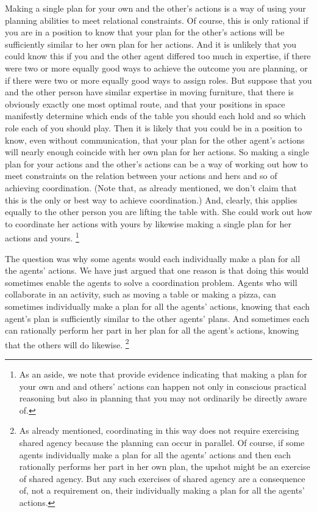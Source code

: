 \documentclass[12pt,\papersize]{extarticle}
\begin{document}
Making a single plan for your own and the other's actions is a way of using your planning abilities to meet relational constraints.
Of course, 
this is only rational  if you are in a position to know that your plan for the other's actions will be sufficiently similar to her own plan for her actions.
And it is unlikely that you could know this if 
	you and the other agent differed too much in expertise,
	if there were two or more equally good ways to achieve the outcome you are planning,
	or if there were two or more equally good ways to assign roles.
But suppose that you and the other person have similar expertise in moving furniture, 
	that there is obviously exactly one most optimal route,
	 and that your positions in space manifestly determine which ends of the table you should each hold and so which role each of you should play. 
Then it is likely that you could  be in a position to know,
	even without communication,
	that your plan for the other agent's actions will nearly enough coincide with her own plan for her actions.
So  making a single plan for your actions and the other's actions can be a way of 
	working out how to 
	meet constraints on the relation between your actions and hers and so of achieving coordination.  
(Note that, as already mentioned,  we don't claim that this  is the only or best way to achieve coordination.)	
And, clearly, this applies equally to the 
 other person you are lifting the table with.
 She  could work out how to coordinate her actions with yours by likewise making a single plan for her actions and yours.%
\footnote{
As an aside, we note that 
\citet{tsai:2011_groop_effect} provide evidence indicating that making a plan for your own and and others' actions can happen not only in conscious practical reasoning but also in planning that you may not ordinarily be directly aware of.
}

The question was why some agents would each individually make a plan for all the agents' actions.
We have just argued that  
one reason is that
doing this would sometimes enable the agents to solve a coordination problem.
Agents who will collaborate in an activity, such as moving a table or making a pizza, 
can sometimes individually make a  plan for all the agents' actions,
knowing that each agent's plan is sufficiently similar to the other agents' plans.
And sometimes each can rationally perform her part in her plan for all the agent's actions, knowing that the others will do likewise.%
\footnote{
As already mentioned, coordinating in this way does not require exercising shared agency because the planning can occur in parallel.
Of course,
	if some agents individually make a plan for all the agents' actions
	and then each rationally performs her part in her own plan,
	the upshot might be an exercise of shared agency.
But any such exercises of shared agency are a consequence of, not a requirement on, their individually making a plan for all the agents' actions.
}
\end{document}
